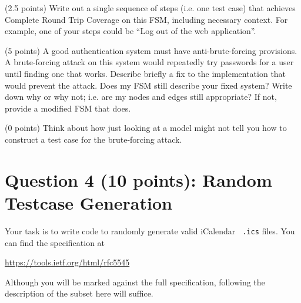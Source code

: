 \documentclass[10pt,hidelinks]{article}
\begin{document}
\begin{center}
\end{center}

(2.5 points) Write out a single sequence of steps (i.e. one test case)
that achieves Complete Round Trip Coverage on this FSM, including
necessary context. For example, one of your steps could be ``Log out
of the web application''.

(5 points) A good authentication system must have anti-brute-forcing
provisions. A brute-forcing attack on this system would repeatedly try
passwords for a user until finding one that works. Describe briefly a
fix to the implementation that would prevent the attack. Does my FSM
still describe your fixed system? Write down why or why not; i.e. are
my nodes and edges still appropriate? If not, provide a modified FSM
that does.

(0 points) Think about how just looking at a model might not tell you
how to construct a test case for the brute-forcing attack.

\section*{Question 4 (10 points): Random Testcase Generation}

Your task is to write code to randomly generate valid iCalendar {\tt
  .ics} files. You can find the specification at

\begin{center}
  \url{https://tools.ietf.org/html/rfc5545}
\end{center}
Although you will be marked against the full specification, following
the description of the subset here will suffice.
\end{document}
